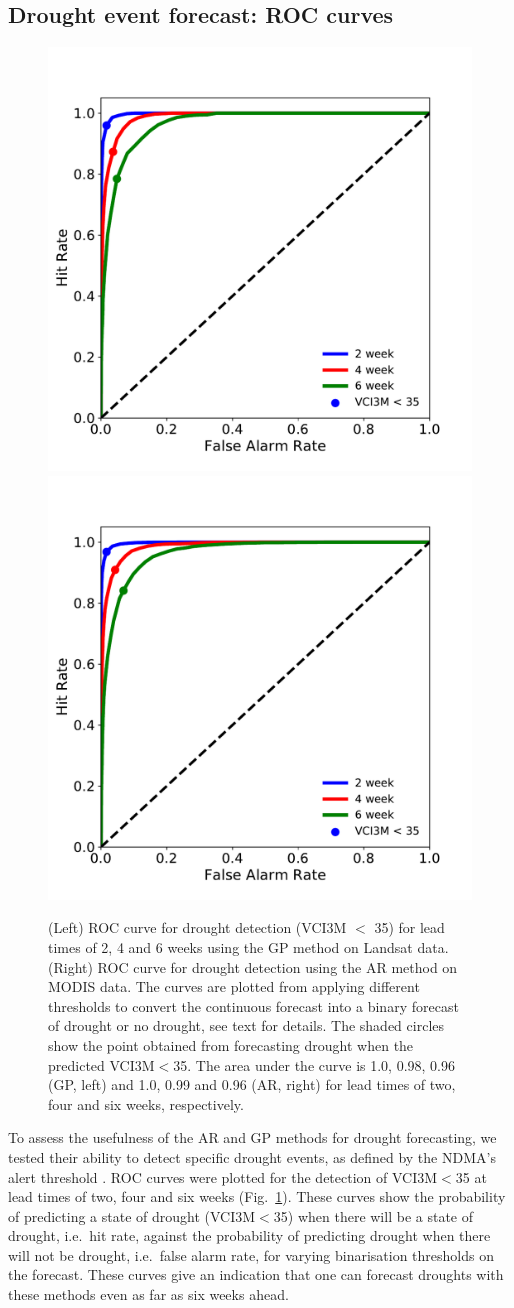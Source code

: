 \documentclass[review]{elsarticle}
\begin{document}
\subsection{Drought event forecast: ROC curves}



\begin{figure}%
	\centering
	\includegraphics[trim = 20mm 4mm 12mm 3mm,width=5.6 cm]{figures/VCIROC_Landsat.pdf}
	\qquad
	\includegraphics[trim = 12mm 4mm 20mm 3mm,width=5.6 cm]{figures/VCIROC_MODIS.pdf}
	\caption{(Left) ROC curve for drought detection (VCI3M $<$ 35) for lead times of 2, 4 and 6 weeks using the GP method on Landsat data. (Right) ROC curve for drought detection using the AR method on MODIS data. The curves are plotted from applying different thresholds to convert the continuous forecast into a binary forecast of drought or no drought, see text for details. The shaded circles show the point obtained from forecasting drought when the predicted VCI3M$<$35. The area under the curve is 1.0, 0.98, 0.96 (GP, left) and 1.0, 0.99 and 0.96 (AR, right) for lead times of two, four and six weeks, respectively. }
	\label{fig:ROC_abb}
\end{figure}





To assess the usefulness of the AR and GP methods for drought forecasting, we tested their ability to detect specific drought events, as defined by the NDMA's alert threshold \citep[VCI3M$<$35,][]{rs8040267}. ROC curves were plotted for the detection of VCI3M$<$35 at lead times of two, four and six weeks (Fig.~\ref{fig:ROC_abb}). These curves show the probability of predicting a state of drought (VCI3M$<$35) when there will be a state of drought, i.e.~hit rate, against the probability of predicting drought when there will not be drought, i.e.~false alarm rate, for varying binarisation thresholds on the forecast. These curves give an indication that one can  forecast droughts with these methods even as far as six weeks ahead. 
\end{document}
